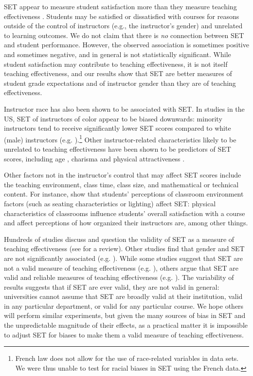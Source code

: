 \documentclass[12pt]{article}
\begin{document}
SET appear to measure student 
satisfaction more than they measure teaching effectiveness \citep{StarkFreishtat2014}. 
Students may be satisfied or dissatisfied with courses for reasons outside of the control of instructors
(e.g., the instructor's gender) and unrelated to learning outcomes.
We do not claim that there is \emph{no} connection between SET and student
performance.
However, the observed association is sometimes positive and sometimes
negative, and in general is not statistically significant.
While student satisfaction may contribute to teaching effectiveness, it is not itself teaching effectiveness,
and our results show that SET are better measures of student grade expectations and of instructor 
gender than they are of teaching effectiveness.    

Instructor race has also been shown to be associated with SET.  
In studies in the US, SET of instructors of color appear to be biased downwards:
minority instructors tend to receive significantly lower SET scores compared to white (male) 
instructors (e.g. \citet{Merritt2008}).\footnote{%
  French law does not allow for the use of race-related variables in data sets. 
  We were thus unable to test for racial biases in SET using the French data.
} 
Other instructor-related characteristics likely to be unrelated to teaching 
effectiveness have been shown to be predictors of SET scores, including age 
\citep{Arbuckle2003}, charisma \citep{Shevlin2000} and physical attractiveness 
\citep{Riniolo2006,Hamermesh2005}.  

Other factors not in the instructor's control that may affect SET scores include
the teaching environment, class time, class size, and mathematical or technical content. 
For instance, \citet{Hill2010} show that students' perceptions of classroom environment factors 
(such as seating characteristics or lighting) affect SET:
physical characteristics of classrooms influence students' overall satisfaction with a course
and affect perceptions of how organized their instructors are, among other things.

Hundreds of studies discuss and question the validity of SET as a measure of teaching effectiveness 
(see \citet{Pounder2007} for a review). 
Other studies find that gender and SET are not significantly associated (e.g. \citet{Bennett1982,Centra2000,Elmore1974}). 
While some studies suggest that SET are not a valid measure of teaching effectiveness (e.g. \citet{Galbraith2012,Carrell2010a}), others argue that SET are valid and reliable measures of teaching effectiveness (e.g. \citet{Benton2012,Centra1977}). 
The variability of results suggests that if SET are ever valid, they
are not valid in general: universities cannot assume that SET are broadly valid at their
institution, valid in any particular department, or valid for any particular course. 
We hope others will perform similar experiments, but given the many sources of bias in 
SET and the unpredictable magnitude of their effects, as a practical matter it is impossible to adjust
SET for biases to make them a valid measure of teaching effectiveness. 
\end{document}
